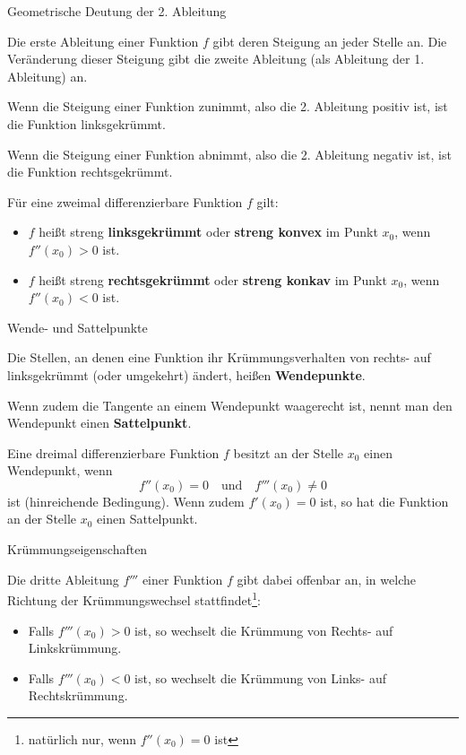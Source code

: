 \begin{frame}{Geometrische Deutung der 2. Ableitung}
\begin{bemerkung}
	Die erste Ableitung einer Funktion $f$ gibt deren Steigung an jeder Stelle an. Die Veränderung dieser Steigung gibt die zweite Ableitung (als Ableitung der 1. Ableitung) an.
	
	Wenn die Steigung einer Funktion zunimmt, also die 2. Ableitung positiv ist, ist die Funktion linksgekrümmt.
	
	Wenn die Steigung einer Funktion abnimmt, also die 2. Ableitung negativ ist, ist die Funktion rechtsgekrümmt.
\end{bemerkung}
\begin{definition}
	Für eine zweimal differenzierbare Funktion $f$ gilt:
	\begin{itemize}
		\item $f$ heißt streng \textbf{linksgekrümmt} oder \textbf{streng konvex} im Punkt $x_{0}$, wenn $f''(x_{0})>0$ ist.
		\item $f$ heißt streng \textbf{rechtsgekrümmt} oder \textbf{streng konkav} im Punkt $x_{0}$, wenn $f''(x_{0})<0$ ist.
	\end{itemize} 
\end{definition}
\end{frame}

\begin{frame}{Wende- und Sattelpunkte}
\begin{definition}
	Die Stellen, an denen eine Funktion ihr Krümmungsverhalten von rechts- auf linksgekrümmt (oder umgekehrt) ändert, heißen \textbf{Wendepunkte}.
	
	Wenn zudem die Tangente an einem Wendepunkt waagerecht ist, nennt man den Wendepunkt einen \textbf{Sattelpunkt}. 	
\end{definition}
\begin{theorem}
	Eine dreimal differenzierbare Funktion $f$ besitzt an der Stelle $x_{0}$ einen Wendepunkt, wenn
	\[
		f''(x_{0}) = 0 \quad \text{und} \quad f'''(x_{0})\neq 0
	\]
	ist (hinreichende Bedingung).
	Wenn zudem $f'(x_{0}) = 0$ ist, so hat die Funktion an der Stelle $x_{0}$ einen Sattelpunkt.
\end{theorem}
\end{frame}
\begin{frame}{Krümmungseigenschaften}
\begin{bemerkung}
	Die dritte Ableitung $f'''$ einer Funktion $f$ gibt dabei offenbar an, in welche Richtung der Krümmungswechsel stattfindet\footnote{natürlich nur, wenn $f''(x_{0})=0$ ist}:
	\begin{itemize}
		\item Falls $f'''(x_{0})>0$ ist, so wechselt die Krümmung von Rechts- auf Linkskrümmung.
		\item Falls $f'''(x_{0})<0$ ist, so wechselt die Krümmung von Links- auf Rechtskrümmung.
	\end{itemize}
\end{bemerkung}
\end{frame}

